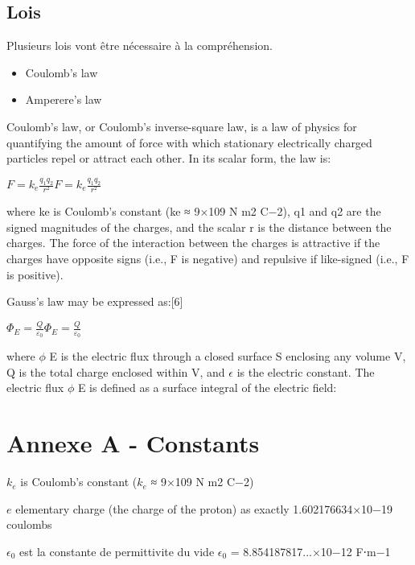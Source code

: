 \documentclass[12 pt, a4paper]{report} %
\begin{document}
\subsection{Lois}

Plusieurs lois vont être nécessaire à la compréhension.

\begin{itemize}
    \item Coulomb's law
    \item Amperere's law
\end{itemize}

Coulomb's law, or Coulomb's inverse-square law, is a law of physics for quantifying the amount of force with which stationary electrically charged particles repel or attract each other. In its scalar form, the law is:

${\displaystyle F=k_{e}{\frac {q_{1}q_{2}}{r^{2}}}} {\displaystyle F=k_{e}{\frac {q_{1}q_{2}}{r^{2}}}}$

where ke is Coulomb's constant (ke ≈ 9×109 N m2 C−2), q1 and q2 are the signed magnitudes of the charges, and the scalar r is the distance between the charges. The force of the interaction between the charges is attractive if the charges have opposite signs (i.e., F is negative) and repulsive if like-signed (i.e., F is positive).

Gauss's law may be expressed as:[6]

${\displaystyle \Phi _{E}={\frac {Q}{\varepsilon _{0}}}} \Phi_E = \frac{Q}{\varepsilon_0}$

where $\phi$ E is the electric flux through a closed surface S enclosing any volume V, Q is the total charge enclosed within V, and $\epsilon$ is the electric constant. The electric flux $\phi$ E is defined as a surface integral of the electric field:

\pagebreak

\section*{Annexe A - Constants}
$k_{e}$ is Coulomb's constant ($k_{e}$ ≈ 9×109 N m2 C−2)

$e$ elementary charge (the charge of the proton) as exactly
1.602176634×10−19 coulombs

$\epsilon_{0}$ est la constante de permittivite du vide
$\epsilon_{0}$ = 8.854187817...×10−12 F⋅m−1



\end{document}
